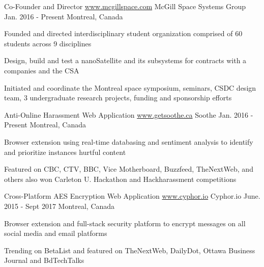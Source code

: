 

\begin{cventries}

  \cventry
    {Co-Founder and Director \acvHeaderSocialSep \href{http://www.mcgillspace.com/}{www.mcgillspace.com}} %
    {McGill Space Systems Group} %
    {Jan. 2016 - Present} %
    {Montreal, Canada} %
    {
      \begin{cvitems} %
        \item{ Founded and directed interdisciplinary student organization comprised of 60 students across 9 disciplines }
        \item{ Design, build and test a nanoSatellite and its subsystems for contracts with a companies and the CSA }
        \item{ Initiated and coordinate the Montreal space symposium, seminars, CSDC design team, 3 undergraduate research projects, funding and sponsorship efforts }
      \end{cvitems}
    }
    
  \cventry
    {Anti-Online Harassment Web Application \acvHeaderSocialSep \href{http://www.getsoothe.ca}{www.getsoothe.ca}} %
    {Soothe} %
    {Jan. 2016 - Present} %
    {Montreal, Canada} %
    {
      \begin{cvitems} %
        \item{ Browser extension using real-time databasing and sentiment analysis to identify and prioritize instances hurtful content }
        \item{Featured on CBC, CTV, BBC, Vice Motherboard, Buzzfeed, TheNextWeb, and others also won Carleton U. Hackathon and Hackharassment competitions }
      \end{cvitems}
    }
 
 \cventry
    {Cross-Platform AES Encryption Web Application \acvHeaderSocialSep \href{https://www.cyphor.io}{www.cyphor.io}} %
    {Cyphor.io} %
    {June. 2015 - Sept 2017} %
    {Montreal, Canada} %
    {
      \begin{cvitems} %
        \item{ Browser extension and full-stack security platform to encrypt messages on all social media and email platforms }
        \item{ Trending on BetaList and featured on TheNextWeb, DailyDot, Ottawa Business Journal and BdTechTalks }
      \end{cvitems}
    }

\end{cventries}
